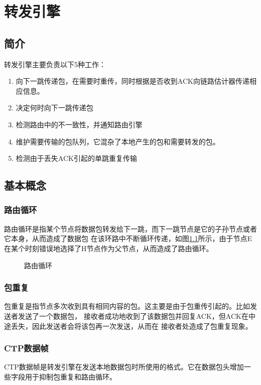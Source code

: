 \chapter{转发引擎}\label{forward}

\section{简介}
转发引擎主要负责以下5种工作：
\vspace{-8pt}
\begin{enumerate}
	\item 向下一跳传递包，在需要时重传，同时根据是否收到ACK向链路估计器传递相应信息。
	\item 决定何时向下一跳传递包
	\item 检测路由中的不一致性，并通知路由引擎
	\item 维护需要传输的包队列，它混杂了本地产生的包和需要转发的包。
	\item 检测由于丢失ACK引起的单跳重复传输
\end{enumerate}

\section{基本概念}
\subsection{路由循环}
路由循环是指某个节点将数据包转发给下一跳，而下一跳节点是它的子孙节点或者它本身，从而造成了数据包
在该环路中不断循环传递，如图\ref{route-loop}所示，由于节点E在某个时刻错误地选择了H节点作为父节点，从而造成了路由循环。

\begin{figure}[ht]
\centering

\caption{路由循环}\label{route-loop}
\end{figure}

\subsection{包重复}
包重复是指节点多次收到具有相同内容的包。这主要是由于包重传引起的。比如发送者发送了一个数据包，
接收者成功地收到了该数据包并回复ACK，但ACK在中途丢失，因此发送者会将该包再一次发送，从而在
接收者处造成了包重复现象。

\subsection{CTP数据帧}
CTP数据帧是转发引擎在发送本地数据包时所使用的格式。它在数据包头增加一些字段用于抑制包重复和路由循环。

